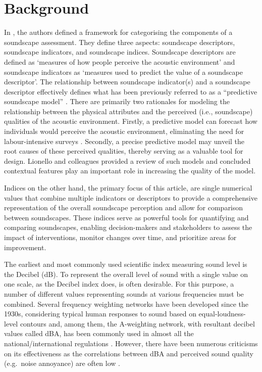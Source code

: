 \documentclass[
  authoryear,
  preprint,
  3p]{elsarticle}
\begin{document}
\section{Background}\label{background}

In \citet{Aletta2016Soundscape}, the authors defined a framework for
categorising the components of a soundscape assessment. They define
three aspects: soundscape descriptors, soundscape indicators, and
soundscape indices. Soundscape descriptors are defined as `measures of
how people perceive the acoustic environment' and soundscape indicators
as `measures used to predict the value of a soundscape descriptor'. The
relationship between soundscape indicator(s) and a soundscape descriptor
effectively defines what has been previously referred to as a
``predictive soundscape model''
\citep{Aletta2016Soundscape, Mitchell2022Predictive}. There are
primarily two rationales for modeling the relationship between the
physical attributes and the perceived (i.e., soundscape) qualities of
the acoustic environment. Firstly, a predictive model can forecast how
individuals would perceive the acoustic environment, eliminating the
need for labour-intensive surveys \citep{Mitchell2023conceptual}.
Secondly, a precise predictive model may unveil the root causes of these
perceived qualities, thereby serving as a valuable tool for design.
Lionello and colleagues \citep{Lionello2020systematic} provided a review
of such models and concluded contextual features play an important role
in increasing the quality of the model.

Indices on the other hand, the primary focus of this article, are single
numerical values that combine multiple indicators or descriptors to
provide a comprehensive representation of the overall soundscape
perception and allow for comparison between soundscapes. These indices
serve as powerful tools for quantifying and comparing soundscapes,
enabling decision-makers and stakeholders to assess the impact of
interventions, monitor changes over time, and prioritize areas for
improvement\citep{Kang2019Towards}.

The earliest and most commonly used scientific index measuring sound
level is the Decibel (dB). To represent the overall level of sound with
a single value on one scale, as the Decibel index does, is often
desirable. For this purpose, a number of different values representing
sounds at various frequencies must be combined. Several frequency
weighting networks have been developed since the 1930s, considering
typical human responses to sound based on equal-loudness-level contours
\citep{Fletcher1933Loudness} and, among them, the A-weighting network,
with resultant decibel values called dBA, has been commonly used in
almost all the national/international regulations
\citep{Kryter1970Effects}. However, there have been numerous criticisms
on its effectiveness \citep{Parmanen2007weighted} as the correlations
between dBA and perceived sound quality (e.g.~noise annoyance) are often
low \citep{Hellman1987Why}.
\end{document}
